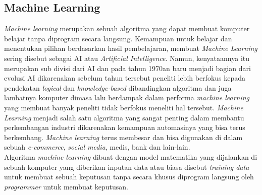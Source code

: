 \subsection{Machine Learning} \label{II.Dasar Teori}
\textit{Machine learning} merupakan sebuah algoritma yang dapat membuat komputer belajar tanpa diprogram secara langsung\cite{alpaydin2021machine}. Kemampuan untuk belajar dan menentukan pilihan berdasarkan hasil pembelajaran, membuat \textit{Machine Learning} sering disebut sebagai AI atau \textit{Artificial Intelligence}. Namun, kenyataannya itu merupakan sub divisi dari AI dan pada tahun 1970an baru menjadi bagian dari evolusi AI dikarenakan sebelum tahun tersebut peneliti lebih berfokus kepada pendekatan \textit{logical} dan \textit{knowledge-based} dibandingkan algoritma dan juga lambatnya komputer dimasa lalu berdampak dalam performa \textit{machine learning} yang membuat banyak peneliti tidak berfokus meneliti hal tersebut\cite{fradkov2020early}. \textit{Machine Learning} menjadi salah satu algoritma yang sangat penting dalam membantu perkembangan industri dikarenakan kemampuan automasinya yang bisa terus berkembang\cite{jordan2015machine}. \textit{Machine learning} terus membesar dan bisa digunakan di dalam sebuah \textit{e-commerce}, \textit{social media}, medis, bank dan lain-lain\cite{jordan2015machine}.\\
Algoritma \textit{machine learning} dibuat dengan model matematika yang dijalankan di sebuah komputer yang diberikan inputan data atau biasa disebut \textit{training data} untuk membuat sebuah keputusan tanpa secara khusus diprogram langsung oleh \textit{programmer} untuk membuat keputusan\cite{alpaydin2021machine}.

